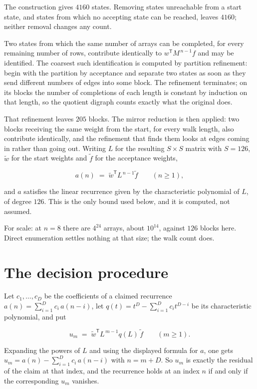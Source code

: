 \documentclass[11pt]{article}
\theoremstyle{definition}
\begin{document}
The construction gives $4160$ states. Removing states unreachable from a start state, and states from which no accepting state can be reached, leaves $4160$; neither removal changes any count.

Two states from which the same number of arrays can be completed, for every remaining number of rows, contribute identically to $w^{\mathsf T}M^{\,n-1}f$ and may be identified. The coarsest such identification is computed by partition refinement: begin with the partition by acceptance and separate two states as soon as they send different numbers of edges into some block. The refinement terminates; on its blocks the number of completions of each length is constant by induction on that length, so the quotient digraph counts exactly what the original does.

That refinement leaves $205$ blocks. The mirror reduction is then applied: two blocks receiving the same weight from the start, for every walk length, also contribute identically, and the refinement that finds them looks at edges coming in rather than going out. Writing $L$ for the resulting $S \times S$ matrix with $S = 126$, $\tilde w$ for the start weights and $\tilde f$ for the acceptance weights,

\[a(n) \;=\; \tilde w^{\mathsf T} L^{\,n-1} \tilde f \qquad (n \ge 1),\]

and $a$ satisfies the linear recurrence given by the characteristic polynomial of $L$, of degree $126$. This is the only bound used below, and it is computed, not assumed.

For scale: at $n = 8$ there are $4^{24}$ arrays, about $10^{14}$, against $126$ blocks here. Direct enumeration settles nothing at that size; the walk count does.

\section{The decision procedure}

Let $c_1,\dots,c_D$ be the coefficients of a claimed recurrence $a(n) = \sum_{i=1}^{D} c_i\,a(n-i)$, let $q(t) = t^{D} - \sum_{i=1}^{D} c_i t^{D-i}$ be its characteristic polynomial, and put

\[u_m \;=\; \tilde w^{\mathsf T} L^{\,m-1} q(L)\,\tilde f \qquad (m \ge 1).\]

Expanding the powers of $L$ and using the displayed formula for $a$, one gets $u_m = a(n) - \sum_{i=1}^{D} c_i\,a(n-i)$ with $n = m + D$. So $u_m$ is exactly the residual of the claim at that index, and the recurrence holds at an index $n$ if and only if the corresponding $u_m$ vanishes.
\end{document}
